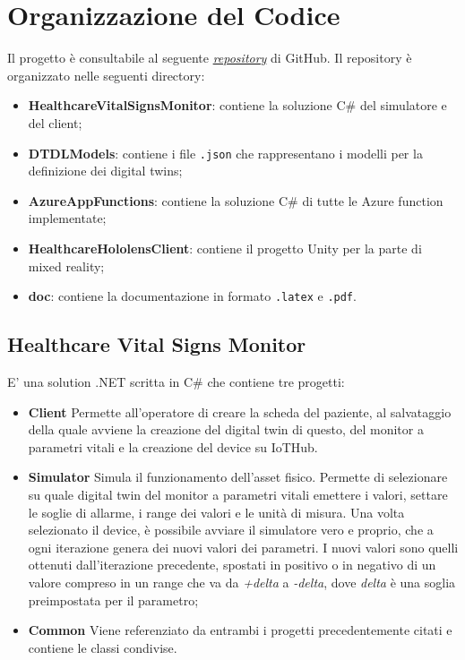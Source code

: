 \section{Organizzazione del Codice}

Il progetto è consultabile al seguente \href{https://github.com/lucagiorgettismp/AzureHealthcareDigitalTwins}{\textit{repository}} di GitHub. Il repository è organizzato nelle seguenti directory:

\begin{itemize}

    \item \textbf{HealthcareVitalSignsMonitor}: contiene la soluzione C\# del simulatore e del client;
    
    \item \textbf{DTDLModels}: contiene i file \texttt{.json} che rappresentano i modelli per la definizione dei digital twins;
    
    \item \textbf{AzureAppFunctions}: contiene la soluzione C\# di tutte le Azure function implementate;

    \item \textbf{HealthcareHololensClient}: contiene il progetto Unity per la parte di mixed reality;
        
    \item \textbf{doc}: contiene la documentazione in formato \texttt{.latex} e \texttt{.pdf}.
\end{itemize}

\subsection{Healthcare Vital Signs Monitor}
E' una solution .NET scritta in C\# che contiene tre progetti:
\begin{itemize}
    \item \textbf{Client} \newline
    Permette all'operatore di creare la scheda del paziente, al salvataggio della quale avviene la creazione del digital twin di questo, del monitor a parametri vitali e la creazione del device su IoTHub.
    \item \textbf{Simulator} \newline 
    Simula il funzionamento dell'asset fisico. Permette di selezionare su quale digital twin del monitor a parametri vitali emettere i valori, settare le soglie di allarme, i range dei valori e le unità di misura. 
    \newline Una volta selezionato il device, è possibile avviare il simulatore vero e proprio, che a ogni iterazione genera dei nuovi valori dei parametri. I nuovi valori sono quelli ottenuti dall'iterazione precedente, spostati in positivo o in negativo di un valore compreso in un range che va da \textit{+delta} a \textit{-delta}, dove \textit{delta} è una soglia preimpostata per il parametro; 
    \item \textbf{Common} \newline 
    Viene referenziato da entrambi i progetti precedentemente citati e contiene le classi condivise.
\end{itemize}

